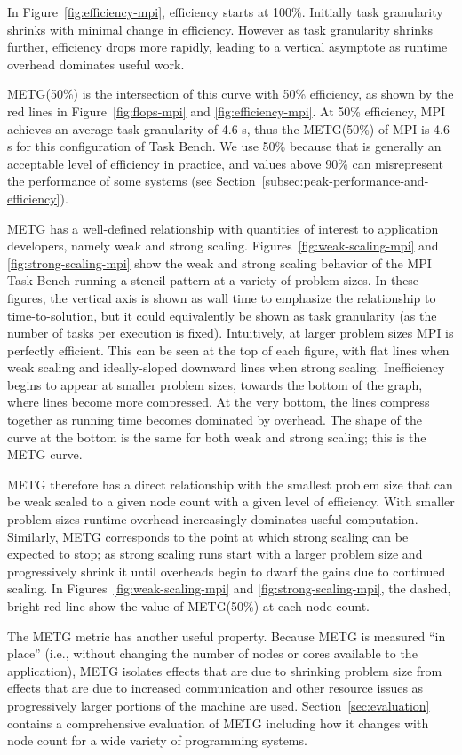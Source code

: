 In Figure~\ref{fig:efficiency-mpi},
efficiency starts at 100\%. Initially task granularity
shrinks with minimal change in efficiency. However as task
granularity shrinks further, efficiency drops more rapidly, leading
to a vertical asymptote as runtime overhead dominates useful work.


METG(50\%) is the intersection of this curve with 50\% efficiency, as
shown by the red lines in Figure~\ref{fig:flops-mpi} and
\ref{fig:efficiency-mpi}. At 50\% efficiency, MPI achieves an average
task granularity of
4.6 \textmu{}s, thus the METG(50\%) of MPI is 4.6 \textmu{}s for this configuration of
Task Bench. We use 50\% because that is generally an acceptable level
of efficiency in practice, and values above 90\% can misrepresent the
performance of some systems (see
Section~\ref{subsec:peak-performance-and-efficiency}).




METG has a well-defined
relationship with quantities of interest to application developers,
namely weak and strong scaling. Figures~\ref{fig:weak-scaling-mpi} and
\ref{fig:strong-scaling-mpi} show the weak and strong scaling behavior of the MPI Task Bench running a stencil pattern at a variety of problem sizes. In these
figures, the vertical axis is shown as wall time to emphasize the
relationship to time-to-solution, but it could equivalently be shown
as task granularity (as the number of tasks per execution is
fixed). Intuitively, at
larger problem sizes MPI is perfectly efficient. This can be seen at
the top of each figure, with flat lines when weak scaling and
ideally-sloped downward lines when strong scaling. Inefficiency begins
to appear at smaller problem sizes, towards the bottom of the graph,
where lines become more compressed. At the
very bottom, the lines compress together as running time becomes dominated by overhead. The shape of the curve at the bottom is the same
for both weak and strong scaling; this is
the METG curve.

METG therefore has a direct relationship with the smallest problem
size that can be weak scaled to a given node count with a given level
of efficiency. With smaller problem sizes runtime overhead increasingly dominates useful
computation. Similarly, METG corresponds to the point at which strong
scaling can be expected to stop; as strong scaling runs start with a
larger problem size and progressively shrink it until overheads begin
to dwarf the gains due to continued scaling. In
Figures~\ref{fig:weak-scaling-mpi} and \ref{fig:strong-scaling-mpi},
the dashed, bright red line show the value of METG(50\%) at each node
count.

The METG metric has another useful property. Because METG is measured ``in place'' (i.e.,
without changing the number of nodes or cores available to the
application), METG isolates effects that are
due to shrinking problem size from effects that are due to
increased communication and other resource issues as
progressively larger portions of the machine are used. Section~\ref{sec:evaluation} contains a comprehensive evaluation of
METG including how it changes with node count for a wide variety of
programming systems.
